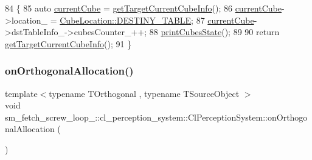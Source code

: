 \begin{DoxyCode}
84             \{
85                 \textcolor{keyword}{auto} \hyperlink{classsm__fetch__screw__loop__1_1_1cl__perception__system_1_1ClPerceptionSystem_a6efb1a252a4cb0c5c7ce325c9021f374}{currentCube} = \hyperlink{classsm__fetch__screw__loop__1_1_1cl__perception__system_1_1ClPerceptionSystem_a7db81d4aa99849818668b52aee431816}{getTargetCurrentCubeInfo}();
86                 \hyperlink{classsm__fetch__screw__loop__1_1_1cl__perception__system_1_1ClPerceptionSystem_a6efb1a252a4cb0c5c7ce325c9021f374}{currentCube}->location\_ = \hyperlink{namespacesm__fetch__screw__loop__1_1_1cl__perception__system_a8cdb75a4100a10a4a1c6034d9655088dacdc3fdda18904b4a1ac0be036c86f973}{CubeLocation::DESTINY\_TABLE};
87                 \hyperlink{classsm__fetch__screw__loop__1_1_1cl__perception__system_1_1ClPerceptionSystem_a6efb1a252a4cb0c5c7ce325c9021f374}{currentCube}->dstTableInfo\_->cubesCounter\_++;
88                 \hyperlink{classsm__fetch__screw__loop__1_1_1cl__perception__system_1_1ClPerceptionSystem_afcfc92b39e72177e9917cec8642da11f}{printCubesState}();
89 
90                 \textcolor{keywordflow}{return} \hyperlink{classsm__fetch__screw__loop__1_1_1cl__perception__system_1_1ClPerceptionSystem_a7db81d4aa99849818668b52aee431816}{getTargetCurrentCubeInfo}();
91             \}
\end{DoxyCode}
\mbox{\label{classsm__fetch__screw__loop__1_1_1cl__perception__system_1_1ClPerceptionSystem_ad6620a9824a17322ed043a1c1f4283c4}} 
\subsubsection{\texorpdfstring{on\+Orthogonal\+Allocation()}{onOrthogonalAllocation()}}
{\footnotesize\ttfamily template$<$typename T\+Orthogonal , typename T\+Source\+Object $>$ \\
void sm\+\_\+fetch\+\_\+screw\+\_\+loop\+\_\+::cl\+\_\+perception\+\_\+system\+::\+Cl\+Perception\+System\+::on\+Orthogonal\+Allocation (\begin{DoxyParamCaption}{ }\end{DoxyParamCaption})\hspace{0.3cm}{\ttfamily [inline]}}



